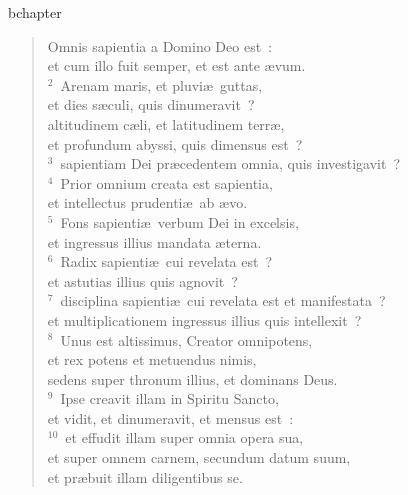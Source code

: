bchapter\begin{verse}\vspace{-19pt}Omnis sapientia a Domino Deo est~:\\ et cum illo fuit semper, et est ante \ae vum.\\
${}^{2}$~Arenam maris, et pluvi\ae\ guttas,\\ et dies s\ae culi, quis dinumeravit~?\\ altitudinem c\ae li, et latitudinem terr\ae ,\\ et profundum abyssi, quis dimensus est~?\\
${}^{3}$~sapientiam Dei pr\ae cedentem omnia, quis investigavit~?\\
${}^{4}$~Prior omnium creata est sapientia,\\ et intellectus prudenti\ae\ ab \ae vo.\\
${}^{5}$~Fons sapienti\ae\ verbum Dei in excelsis,\\ et ingressus illius mandata \ae terna.\\
${}^{6}$~Radix sapienti\ae\ cui revelata est~?\\ et astutias illius quis agnovit~?\\
${}^{7}$~disciplina sapienti\ae\ cui revelata est et manifestata~?\\ et multiplicationem ingressus illius quis intellexit~?\\
${}^{8}$~Unus est altissimus, Creator omnipotens,\\ et rex potens et metuendus nimis,\\ sedens super thronum illius, et dominans Deus.\\
${}^{9}$~Ipse creavit illam in Spiritu Sancto,\\ et vidit, et dinumeravit, et mensus est~:\\
${}^{10}$~et effudit illam super omnia opera sua,\\ et super omnem carnem, secundum datum suum,\\ et pr\ae buit illam diligentibus se.\end{verse}


